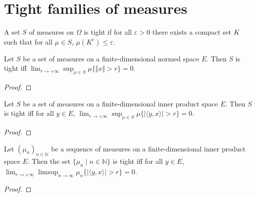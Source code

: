 \chapter{Tight families of measures}

\begin{definition}\label{def:tight}
 \mathlibok
A set $S$ of measures on $\Omega$ is tight if for all $\varepsilon > 0$ there exists a compact set $K$ such that for all $\mu \in S$, $\mu(K^c) \le \varepsilon$.
\end{definition}


\begin{lemma}\label{lem:isTightMeasureSet_iff_norm}
\mathlibok
{}
Let $S$ be a set of measures on a finite-dimensional normed space $E$. 
Then $S$ is tight iff $\lim_{r \to +\infty}\sup_{\mu \in S} \mu\{\Vert x \Vert > r\} = 0$.
\end{lemma}

\begin{proof}\leanok

\end{proof}
	

\begin{lemma}\label{lem:isTightMeasureSet_iff_sup_inner}
\mathlibok
{}
Let $S$ be a set of measures on a finite-dimensional inner product space $E$.
Then $S$ is tight iff for all $y \in E$, $\lim_{r \to +\infty}\sup_{\mu \in S} \mu\{\vert\langle y, x\rangle\vert > r\} = 0$.
\end{lemma}

\begin{proof}\leanok
{}
\end{proof}


\begin{lemma}\label{lem:isTightMeasureSet_iff_basis}
\leanok
{}
Let $(\mu_n)_{n \in \mathbb{N}}$ be a sequence of measures on a finite-dimensional inner product space $E$. 
Then the set $\{\mu_n \mid n \in \mathbb{N}\}$ is tight iff for all $y \in E$, $\lim_{r \to +\infty}\limsup_{n \to \infty} \mu_n\{\vert\langle y, x\rangle\vert > r\} = 0$.
\end{lemma}

\begin{proof}\leanok
{}
\end{proof}


